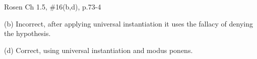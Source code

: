 \documentclass[12pt]{exam}
\newenvironment{my_item}{
\begin{itemize}
    \setlength{\itemsep}{1pt}
    \setlength{\parskip}{0pt}
    \setlength{\parsep}{0pt}
}{\end{itemize}}
\begin{document}
\begin{questions}
\question Rosen Ch 1.5, \#16(b,d), p.73-4
    \begin{solution}
    \begin{my_item}
        \item[(b)] Incorrect, after applying universal instantiation it uses the fallacy of denying the hypothesis.
        \item[(d)] Correct, using universal instantiation and modus ponens.
    \end{my_item}
    \end{solution}

\end{questions}
\end{document}
